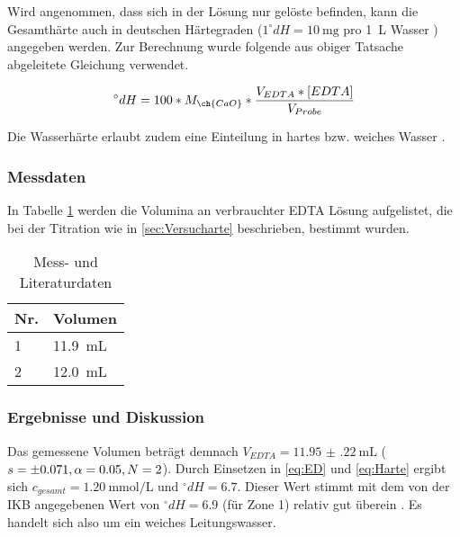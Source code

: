 \documentclass{article}
\begin{document}
        Wird angenommen, dass sich in der Lösung nur gelöste  befinden, kann die Gesamthärte auch in deutschen Härtegraden ($1 ^\circ dH = \SI[mode=text]{10}{\milli\gram}$  pro \SI[mode=text]{1}{\liter} Wasser \cite{deutscherharte}) angegeben werden. Zur Berechnung wurde folgende aus obiger Tatsache abgeleitete Gleichung verwendet.
        
        \begin{equation}
          ^\circ dH = 100 * M_{\ch{CaO}} * \frac{V_{EDTA} * [EDTA]}{V_{Probe}} \label{eq:Harte}
        \end{equation}              
        
        Die Wasserhärte erlaubt zudem eine Einteilung in hartes bzw. weiches Wasser \cite{Wasserharte}.
        
      \subsubsection{Messdaten}
        
        In Tabelle \ref{tab:MessdatenHarte} werden die Volumina an verbrauchter EDTA Lösung aufgelistet, die bei der Titration wie in \ref{sec:Versucharte} beschrieben, bestimmt wurden. 
        
        \begin{table}[H]
          \centering
          \caption[Messdaten der Bestimmung der Gesamthärte von Leitungswasser, Quelle: Autor]{Mess- und Literaturdaten}
          \label{tab:MessdatenHarte}
            \begin{tabular}{@{}l|l@{}}
              \toprule
               Nr. & Volumen \\ \midrule
               1 & \SI[mode=text]{11.9}{\milli\liter} \\
               2 & \SI[mode=text]{12.0}{\milli\liter} \\ \bottomrule
            \end{tabular}
        \end{table} 
        
      \subsubsection{Ergebnisse und Diskussion}  \label{sec:KomplexeErgebnisse}   
      
        Das gemessene Volumen beträgt demnach $V_{EDTA} = \SI[mode=text,separate-uncertainty]{11.95(22)}{\milli\liter}$ ($s = \num{\pm 0.071}, \alpha=0.05,N=2$). Durch Einsetzen in \eqref{eq:ED} und \eqref{eq:Harte} ergibt sich $c_{gesamt} = \SI[mode=text]{1.20}{\milli\mole\per\liter}$ und $^\circ dH = 6.7$. Dieser Wert stimmt mit dem von der IKB angegebenen Wert von $^\circ dH = 6.9$ (für Zone 1) relativ gut überein \cite{ikb}. Es handelt sich also um ein weiches Leitungswasser. \\
        
\end{document}
